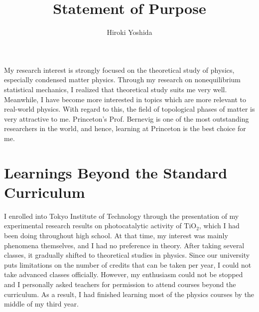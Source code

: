 \documentclass[a4]{article}
\title{Statement of Purpose}
\author{Hiroki Yoshida}
\date{}
\begin{document}
\maketitle

My research interest is strongly focused on the theoretical study of physics, especially condensed matter physics. Through my research on nonequilibrium statistical mechanics, I realized that theoretical study suits me very well. Meanwhile, I have become more interested in topics which are more relevant to real-world physics. With regard to this, the field of topological phases of matter is very attractive to me. Princeton's Prof. Bernevig is one of the most outstanding researchers in the world, and hence, learning at Princeton is the best choice for me.\par

\section{Learnings Beyond the Standard Curriculum}
I enrolled into Tokyo Institute of Technology through the presentation of my experimental research results on photocatalytic activity of TiO$_2$, which I had been doing throughout high school. At that time, my interest was mainly phenomena themselves, and I had no preference in theory. After taking several classes, it gradually shifted to theoretical studies in physics. Since our university puts limitations on the number of credits that can be taken per year, I could not take advanced classes officially. However, my enthusiasm could not be stopped and I personally asked teachers for permission to attend courses beyond the curriculum. As a result, I had finished learning most of the physics courses by the middle of my third year.\par
\end{document}
